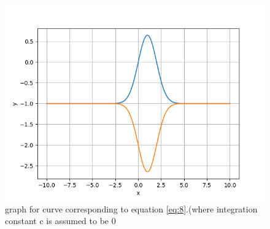 \documentclass[journal,12pt, two column]{IEEEtran}
\begin{document}
\begin{figure}[!ht]
		\centering
		\includegraphics[width=\columnwidth]{figure_1.png}
		\caption{graph for curve corresponding to equation \eqref{eq:8}.(where integration constant c is assumed to be 0}
		\label{fig-1}
	\end{figure}
\end{document}
